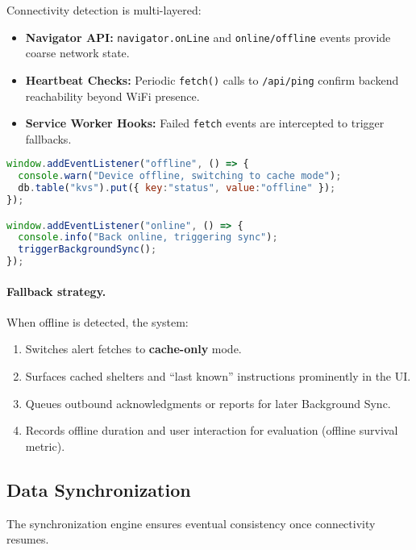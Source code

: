 \documentclass[11pt,twocolumn]{article}
\begin{document}
Connectivity detection is multi-layered:

\begin{itemize}
    \item \textbf{Navigator API:} \texttt{navigator.onLine} and \texttt{online/offline} events provide coarse network state.
    \item \textbf{Heartbeat Checks:} Periodic \texttt{fetch()} calls to \texttt{/api/ping} confirm backend reachability beyond WiFi presence.
    \item \textbf{Service Worker Hooks:} Failed \texttt{fetch} events are intercepted to trigger fallbacks.
\end{itemize}

\begin{lstlisting}[language=JavaScript, caption={Offline Detection System}]
window.addEventListener("offline", () => {
  console.warn("Device offline, switching to cache mode");
  db.table("kvs").put({ key:"status", value:"offline" });
});

window.addEventListener("online", () => {
  console.info("Back online, triggering sync");
  triggerBackgroundSync();
});
\end{lstlisting}

\paragraph{Fallback strategy.}
When offline is detected, the system:
\begin{enumerate}
    \item Switches alert fetches to \textbf{cache-only} mode.
    \item Surfaces cached shelters and ``last known'' instructions prominently in the UI.
    \item Queues outbound acknowledgments or reports for later Background Sync.
    \item Records offline duration and user interaction for evaluation (offline survival metric).
\end{enumerate}

\subsection{Data Synchronization}

The synchronization engine ensures eventual consistency once connectivity resumes.
\end{document}
